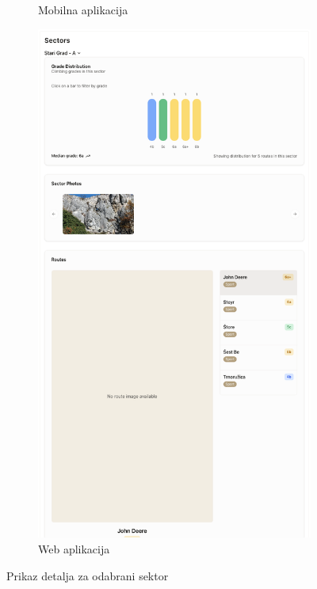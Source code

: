 \begin{figure}[H]
\begin{subfigure}[b]{0.35\textwidth}
        \caption{Mobilna aplikacija}
        \label{fig:prikaz_detalja_za_odabrani_sektor_mob}
    \end{subfigure}
    \hfill
    \begin{subfigure}[b]{0.6\textwidth}
        \centering
        \includegraphics[width=1\textwidth]{images/implementacija/web/crag-details/crag-selected-sector.png}
        \caption{Web aplikacija}
        \label{fig:prikaz_detalja_za_odabrani_sektor_web}
    \end{subfigure}
    \caption{Prikaz detalja za odabrani sektor}
    \label{fig:prikaz_detalja_za_odabrani_sektor}
\end{figure}

